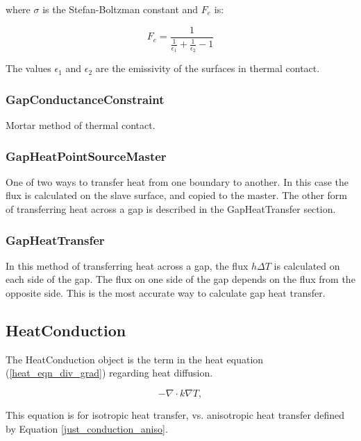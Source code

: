 \documentclass[preprint,5p]{elsarticle}
\begin{document}
where $\sigma$ is the Stefan-Boltzman constant and $F_e$ is:

\begin{equation*}
F_e = \frac{1}{\frac{1}{\epsilon_1} + \frac{1}{\epsilon_2} - 1}
\end{equation*}

The values $\epsilon_1$ and $\epsilon_2$ are the emissivity of the surfaces in thermal contact.

\subsubsection{GapConductanceConstraint}
Mortar method of thermal contact.

\subsubsection{GapHeatPointSourceMaster}
One of two ways to transfer heat from one boundary to another. In this case the flux is calculated on the slave surface, and copied to the master. The other form of transferring heat across a gap is described in the GapHeatTransfer section.

\subsubsection{GapHeatTransfer}
In this method of transferring heat across a gap, the flux $h\Delta T$ is calculated on each side of the gap. The flux on one side of the gap depends on the flux from the opposite side. This is the most accurate way to calculate gap heat transfer.

\subsection{HeatConduction}
The HeatConduction object is the term in the heat equation (\ref{heat_eqn_div_grad}) regarding heat diffusion.

\begin{equation}
- \nabla \cdot  k\nabla T,
\end{equation}

This equation is for isotropic heat transfer, vs. anisotropic heat transfer defined by Equation \ref{just_conduction_aniso}.
\end{document}

